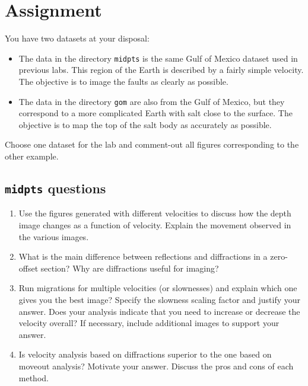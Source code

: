 \section{Assignment}

You have two datasets at your disposal:
\begin{itemize}

  \item The data in the directory \texttt{midpts} is the same Gulf of Mexico dataset used in previous labs. This region of the Earth is described by a fairly simple velocity. The objective is to image the faults as clearly as possible.

  \item The data in the directory \texttt{gom} are also from the Gulf of Mexico, but they correspond to a more complicated Earth with salt close to the surface. The objective is to map the top of the salt body as accurately as possible.

\end{itemize}

Choose one dataset for the lab and comment-out all figures
corresponding to the other example.

\subsection{\texttt{midpts} questions}
\begin{enumerate}

  \item Use the figures generated with different velocities to discuss how the depth image changes as a function of velocity. Explain the movement observed in the various images.

  \item What is the main difference between reflections and diffractions in a zero-offset section? Why are diffractions useful for imaging?

  \item Run migrations for multiple velocities (or slownesses) and explain which one gives you the best image? Specify the slowness scaling factor and justify your answer. Does your analysis indicate that you need to increase or decrease the velocity overall?  If necessary, include additional images to support your answer.

  \item Is velocity analysis based on diffractions superior to the one based on moveout analysis? Motivate your answer. Discuss the pros and cons of each method. 

\end{enumerate}


